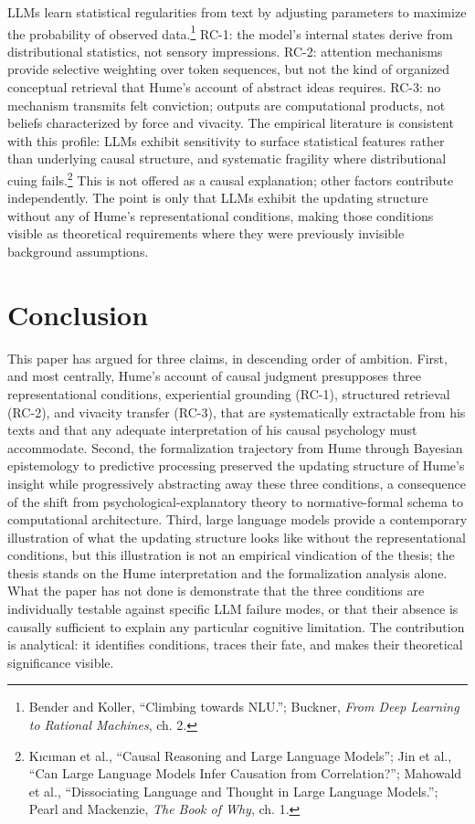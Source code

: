 \documentclass[11pt]{article}
\begin{document}
LLMs learn statistical regularities from text by adjusting parameters to maximize the probability of observed data.\footnote{Bender and Koller, ``Climbing towards NLU.''; Buckner, \emph{From Deep Learning to Rational Machines}, ch. 2.} RC-1: the model's internal states derive from distributional statistics, not sensory impressions. RC-2: attention mechanisms provide selective weighting over token sequences, but not the kind of organized conceptual retrieval that Hume's account of abstract ideas requires. RC-3: no mechanism transmits felt conviction; outputs are computational products, not beliefs characterized by force and vivacity. The empirical literature is consistent with this profile: LLMs exhibit sensitivity to surface statistical features rather than underlying causal structure, and systematic fragility where distributional cuing fails.\footnote{K{\i}c{\i}man et al., ``Causal Reasoning and Large Language Models''; Jin et al., ``Can Large Language Models Infer Causation from Correlation?''; Mahowald et al., ``Dissociating Language and Thought in Large Language Models.''; Pearl and Mackenzie, \emph{The Book of Why}, ch. 1.} This is not offered as a causal explanation; other factors contribute independently. The point is only that LLMs exhibit the updating structure without any of Hume's representational conditions, making those conditions visible as theoretical requirements where they were previously invisible background assumptions.

\section{Conclusion}

This paper has argued for three claims, in descending order of ambition. First, and most centrally, Hume's account of causal judgment presupposes three representational conditions, experiential grounding (RC-1), structured retrieval (RC-2), and vivacity transfer (RC-3), that are systematically extractable from his texts and that any adequate interpretation of his causal psychology must accommodate. Second, the formalization trajectory from Hume through Bayesian epistemology to predictive processing preserved the updating structure of Hume's insight while progressively abstracting away these three conditions, a consequence of the shift from psychological-explanatory theory to normative-formal schema to computational architecture. Third, large language models provide a contemporary illustration of what the updating structure looks like without the representational conditions, but this illustration is not an empirical vindication of the thesis; the thesis stands on the Hume interpretation and the formalization analysis alone. What the paper has not done is demonstrate that the three conditions are individually testable against specific LLM failure modes, or that their absence is causally sufficient to explain any particular cognitive limitation. The contribution is analytical: it identifies conditions, traces their fate, and makes their theoretical significance visible.
\end{document}
